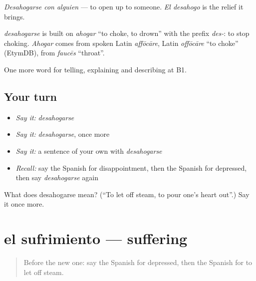 \emph{Desahogarse con alguien} — to open up to someone. \emph{El desahogo} is the relief it brings.

\begin{cousinweb}
\emph{desahogarse} is built on \emph{ahogar} \textquotedblleft{}to choke, to drown\textquotedblright{} with the prefix \emph{des-}: to stop choking. \emph{Ahogar} comes from spoken Latin \emph{affōcāre}, Latin \emph{offōcāre} \textquotedblleft{}to choke\textquotedblright{} (EtymDB), from \emph{faucēs} \textquotedblleft{}throat\textquotedblright{}.
\end{cousinweb}

\begin{grammarlens}[title={What you've built}]
One more word for telling, explaining and describing at B1.
\end{grammarlens}

\subsection*{Your turn}
\begin{itemize}
\raggedright
  \item \emph{Say it:} \emph{desahogarse}
  \item \emph{Say it:} \emph{desahogarse}, once more
  \item \emph{Say it:} a sentence of your own with \emph{desahogarse}
  \item \emph{Recall:} say the Spanish for disappointment, then the Spanish for depressed, then say \emph{desahogarse} again
\end{itemize}

\begin{tcolorbox}[breakable,colback=teal!4,colframe=teal!35!black,title={Before you move on}]
What does desahogarse mean? (\textquotedblleft{}To let off steam, to pour one's heart out\textquotedblright{}.) Say it once more.
\end{tcolorbox}
\section[el sufrimiento]{el sufrimiento — suffering}

\label{lesson:ES-C717-sufrimiento}



\begin{quote}
Before the new one: say the Spanish for depressed, then the Spanish for to let off steam.
\end{quote}


